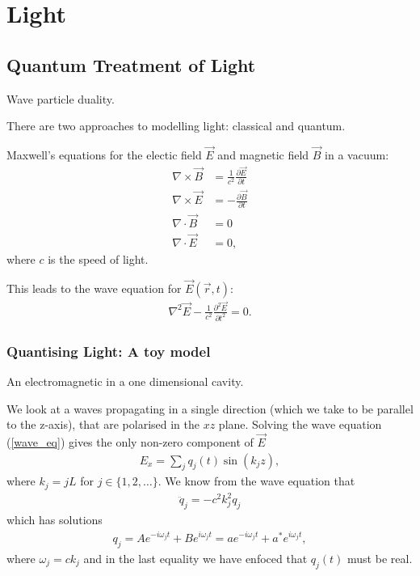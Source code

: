 \chapter{Light} 
\label{ch:Light}

\section{Quantum Treatment of Light}

Wave particle duality.

There are two approaches to modelling light: classical and quantum. 

Maxwell's equations for the electic field $\vec{E}$ and magnetic field $\vec{B}$ in a vacuum:
\begin{align}
  \nabla \times \vec{B} &= \frac{1}{c^2} \frac{\partial \vec{E}}{\partial t} \label{maxwell_be} \\
  \nabla \times \vec{E} &= - \frac{\partial \vec{B}}{\partial t}\\
  \nabla \cdot \vec{B} &= 0 \\
  \nabla \cdot \vec{E} &= 0,
\end{align}
where $c$ is the speed of light.

This leads to the wave equation for $\vec{E}(\vec{r}, t)$:
\begin{align}\label{wave_eq}
  \nabla^2\vec{E} - \frac{1}{c^2} \frac{\partial^2 \vec{E}}{\partial t^2} = 0.
\end{align}

\subsection{Quantising Light: A toy model}

An electromagnetic in a one dimensional cavity.

We look at a waves propagating in a single direction (which we take to be parallel to the z-axis), that are polarised in the $xz$ plane. Solving the wave equation (\ref{wave_eq}) gives the only non-zero component of $\vec{E}$
\begin{align}\label{toy_classical_e}
  E_x = \sum_j q_j(t) \sin(k_j z),
\end{align}
where $k_j = j L$ for $j \in \{1, 2, \dots\}$. We know from the wave equation that
\begin{align}
  \ddot{q}_j = -c^2 k_j^2 q_j
\end{align}
which has solutions
\begin{align}
  q_j = Ae^{-i\omega_j t} + Be^{i\omega_j t} = ae^{-i\omega_j t} + a^*e^{i\omega_j t},
\end{align}
where $\omega_j = c k_j$ and in the last equality we have enfoced that $q_j(t)$ must be real.

